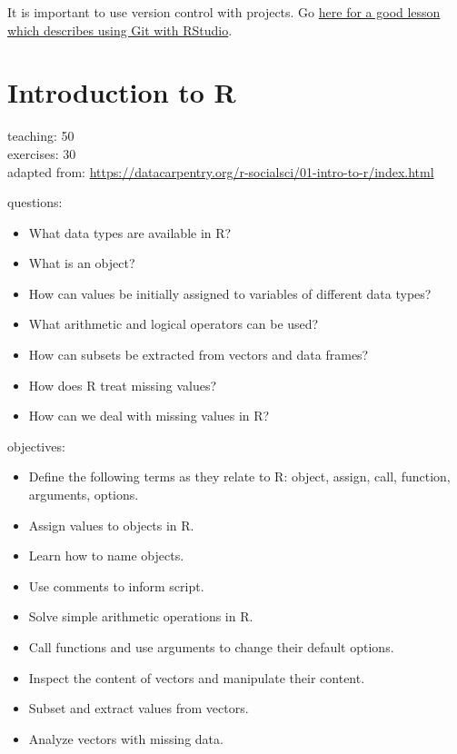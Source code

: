 \documentclass[]{book}
\providecommand{\tightlist}{%
  \setlength{\itemsep}{0pt}\setlength{\parskip}{0pt}}
\begin{document}
It is important to use version control with projects. Go
\href{https://swcarpentry.github.io/git-novice/14-supplemental-rstudio/}{here
for a good lesson which describes using Git with RStudio}.

\chapter{Introduction to R}\label{introduction-to-r}

teaching: 50\\
exercises: 30\\
adapted from:
\url{https://datacarpentry.org/r-socialsci/01-intro-to-r/index.html}

questions:

\begin{itemize}
\tightlist
\item
  What data types are available in R?\\
\item
  What is an object?\\
\item
  How can values be initially assigned to variables of different data
  types?\\
\item
  What arithmetic and logical operators can be used?\\
\item
  How can subsets be extracted from vectors and data frames?\\
\item
  How does R treat missing values?\\
\item
  How can we deal with missing values in R?
\end{itemize}

objectives:

\begin{itemize}
\tightlist
\item
  Define the following terms as they relate to R: object, assign, call,
  function, arguments, options.\\
\item
  Assign values to objects in R.\\
\item
  Learn how to name objects.\\
\item
  Use comments to inform script.\\
\item
  Solve simple arithmetic operations in R.\\
\item
  Call functions and use arguments to change their default options.\\
\item
  Inspect the content of vectors and manipulate their content.\\
\item
  Subset and extract values from vectors.\\
\item
  Analyze vectors with missing data.
\end{itemize}
\end{document}
